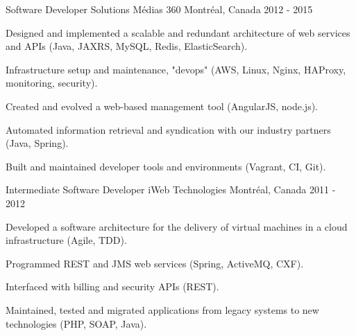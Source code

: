 \begin{cventries}
  \cventry
    {Software Developer} %
    {Solutions Médias 360} %
    {Montréal, Canada} %
    {2012 - 2015} %
    {
      \begin{cvitems} %
        \item {Designed and implemented a scalable and redundant architecture of web services and APIs (Java, JAXRS, MySQL, Redis, ElasticSearch).}
        \item {Infrastructure setup and maintenance, "devops" (AWS, Linux, Nginx, HAProxy, monitoring, security).}
        \item {Created and evolved a web-based management tool (AngularJS, node.js).}
        \item {Automated information retrieval and syndication with our industry partners (Java, Spring).}
        \item {Built and maintained developer tools and environments (Vagrant, CI, Git).}
      \end{cvitems}
    }

  \cventry
    {Intermediate Software Developer} %
    {iWeb Technologies} %
    {Montréal, Canada} %
    {2011 - 2012} %
    {
      \begin{cvitems} %
        \item {Developed a software architecture for the delivery of virtual machines in a cloud infrastructure (Agile, TDD).}
        \item {Programmed REST and JMS web services (Spring, ActiveMQ, CXF).}
        \item {Interfaced with billing and security APIs (REST).}
        \item {Maintained, tested and migrated applications from legacy systems to new technologies (PHP, SOAP, Java).}
      \end{cvitems}
    }



\end{cventries}

